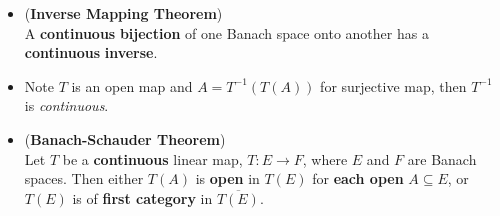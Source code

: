 \documentclass[11pt]{article}
\begin{document}
\begin{itemize}
\item \begin{corollary} (\textbf{Inverse Mapping Theorem}) \citep{reed1980methods} \\
A \textbf{continuous} \textbf{bijection} of one Banach space onto another has a \textbf{continuous} \textbf{inverse}. 
\end{corollary}

\item \begin{remark}
Note $T$ is an open map and $A = T^{-1}(T(A))$ for surjective map, then $T^{-1}$ is \emph{continuous}.
\end{remark}

\item \begin{theorem} (\textbf{Banach-Schauder Theorem}) \citep{reed1980methods}\\
Let $T$ be a \textbf{continuous} linear map, $T: E \rightarrow F$,  where $E$ and $F$ are Banach spaces. Then either $T(A)$ is \textbf{open} in $T(E)$  for \textbf{each open} $A \subseteq E$,  or $T(E)$  is of \textbf{first category} in $\overline{T(E)}$.
\end{theorem}
\end{itemize}
\end{document}
